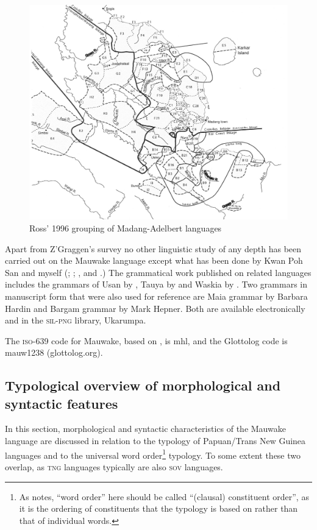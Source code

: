 \begin{figure}
\caption{Ross' 1996 grouping of Madang-Adelbert languages \citep[Map~4]{Ross1996}}
\label{map:4:MadangRoss}
\includegraphics[width=\textwidth]{figures/1-ross_grouping_of_Madang_Adelbert_languages_map.jpeg}
\end{figure}

Apart from Z'Graggen's survey no other linguistic study of any depth has been carried out on the Mauwake language except what has been done by Kwan Poh San and myself (\citealt{Kwan1980, Kwan1983, Kwan1988, Kwan1989, Kwan2002}; \citealt{Jarvinen1980,Jarvinen1988a,Jarvinen1988b,Jarvinen1989,Jarvinen1990,Jarvinen1991}; \citealt{JarvinenEtAl2001}, and \citealt{Berghall2006}.)  The grammatical work published on related languages includes the grammars of Usan by \citet{Reesink1987}, Tauya by \citet{MacDonald1990} and Waskia by \citet{RossEtAl1978}. Two grammars in manuscript form that were also used for reference are Maia grammar by Barbara Hardin and Bargam grammar by Mark Hepner. Both are available electronically and in the \textsc{sil-png} library, Ukarumpa.

The \textsc{iso}-639 code for Mauwake, based on \citet{Grimes2000}, is mhl, and the Glottolog code is mauw1238 (glottolog.org).

\subsection{Typological overview of morphological and syntactic features}
In this section, morphological and syntactic characteristics of the Mauwake language are discussed in relation to the typology of Papuan/Trans New Guinea languages and to the universal word order\footnote{As \citet[72]{Dixon2010a} notes, ``word order'' here should be called ``(clausal) constituent order'', as it is the ordering of constituents that the typology is based on rather than that of individual words.}  typology.  To some extent these two overlap, as \textsc{tng} languages typically are also \textsc{sov} languages.

